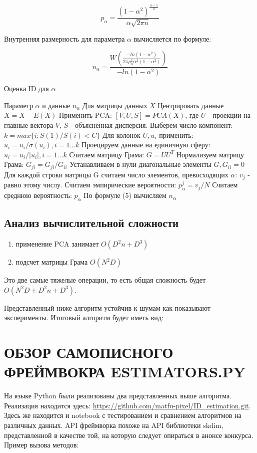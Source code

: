 \documentclass[english, russian]{sobraep}
\begin{document}
\begin{equation}
    p_\alpha = \frac{(1 - \alpha^2)^{\frac{n - 1}{2}}}{\alpha\sqrt{2\pi n}}
\end{equation}

Внутренняя размерность для параметра $\alpha$ вычисляется по формуле: 

\begin{equation}
    n_\alpha = \frac{W(\frac{-ln(1 - \alpha^2)}{2\pi p_\alpha^2\alpha^2(1-\alpha^2)})}{-ln(1 - \alpha^2)}
\end{equation}

\begin{algorithm}
\caption{Оценка ID для $\alpha$}\label{alg:cap}
\begin{algorithmic}[1]
\Require Параметр $\alpha$ и данные
\Ensure $n_\alpha$
\State Для матрицы данных $X$
\State Центрировать данные $X = X - E(X)$
\State Применить PCA: $[V,U,S] = PCA(X)$, где $U$ - проекции на главные вектора $V$, $S$ - объясненная дисперсия. 
\State Выберем число компонент: $k = max\{i: S(1)/S(i) < C\}$
\State Для колонок $U, u_i$ применить: $u_i = u_i / \sigma(u_i), i = 1...k$
\State Проецируем данные на единичную сферу: $u_i = u_i / |u_i|, i=1...k$
\State Считаем матрицу Грама: $G = UU^T$
\State Нормализуем матрицу Грама: $G_{ji} = G_{ji} / G_{ii}$
\State Устанавливаем в нули диагональные элементы $G, G_{ii} = 0$
\State Для каждой строки матрицы G считаем число элементов, превосходящих $\alpha$: $v_j$ - равно этому числу. 
\State Считаем эмпирические вероятности: 
$p_\alpha^j = v_j / N$
\State Считаем среднюю вероятность: $p_\alpha$
\State По формуле (5) вычисляем $n_\alpha$
\end{algorithmic}
\end{algorithm}

\subsection{Анализ вычислительной сложности}
\begin{enumerate}
    \item применение PCA занимает $O(D^2n+D^3)$
    \item подсчет матрицы Грама $O(N^2D)$
\end{enumerate}
Это две самые тяжелые операции, то есть общая сложность будет $O(N^2D + D^2n + D^3)$.

Представленный ниже алгоритм устойчив к шумам как показывают эксперименты. Итоговый алгоритм будет иметь вид:

\section{ОБЗОР САМОПИСНОГО ФРЕЙМВОКРА ESTIMATORS.PY}
На языке Python были реализованы два представленных выше алгоритма. Реализация находится здесь: \url{https://github.com/matfu-pixel/ID_estimation.git}. Здесь же находится и notebook с тестированием и сравнением алгоритмов на различных данных. API фреймворка похоже на API библиотеки skdim, представленной в качестве той, на которую следует опираться в анонсе конкурса. 
Пример вызова методов: 
\end{document}
